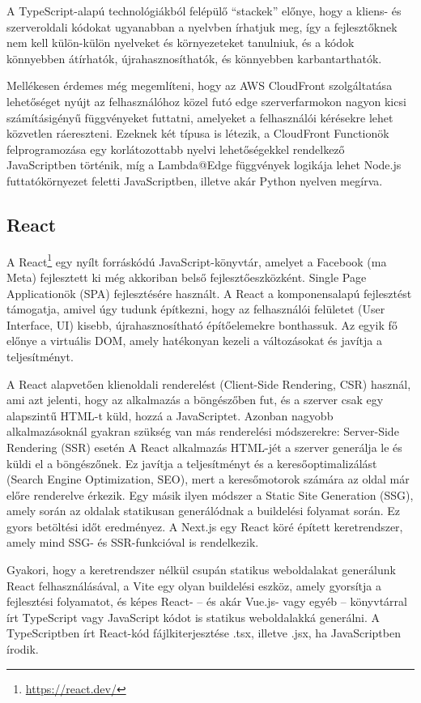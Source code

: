 A TypeScript-alapú technológiákból felépülő ``stackek'' előnye, hogy a kliens- és szerveroldali kódokat ugyanabban a nyelvben írhatjuk meg, így a fejlesztőknek nem kell külön-külön nyelveket és környezeteket tanulniuk, és a kódok könnyebben átírhatók, újrahasznosíthatók, és könnyebben karbantarthatók.

Mellékesen érdemes még megemlíteni, hogy az AWS CloudFront szolgáltatása lehetőséget nyújt az felhasználóhoz közel futó edge szerverfarmokon nagyon kicsi számításigényű függvényeket futtatni, amelyeket a felhasználói kérésekre lehet közvetlen ráereszteni. Ezeknek két típusa is létezik, a CloudFront Functionök felprogramozása egy korlátozottabb nyelvi lehetőségekkel rendelkező JavaScriptben történik, míg a Lambda@Edge függvények logikája lehet Node.js futtatókörnyezet feletti JavaScriptben, illetve akár Python nyelven megírva.

\subsection{React}

A React\footnote{\url{https://react.dev/}} egy nyílt forráskódú JavaScript-könyvtár, amelyet a Facebook (ma Meta) fejlesztett ki még akkoriban belső fejlesztőeszközként. Single Page Applicationök (SPA) fejlesztésére használt. A React a komponensalapú fejlesztést támogatja, amivel úgy tudunk építkezni, hogy az felhasználói felületet (User Interface, UI) kisebb, újrahasznosítható építőelemekre bonthassuk. Az egyik fő előnye a virtuális DOM, amely hatékonyan kezeli a változásokat és javítja a teljesítményt.

A React alapvetően klienoldali renderelést (Client-Side Rendering, CSR) használ, ami azt jelenti, hogy az alkalmazás a böngészőben fut, és a szerver csak egy alapszintű HTML-t küld, hozzá a JavaScriptet. Azonban nagyobb alkalmazásoknál gyakran szükség van más renderelési módszerekre: Server-Side Rendering (SSR) esetén A React alkalmazás HTML-jét a szerver generálja le és küldi el a böngészőnek. Ez javítja a teljesítményt és a keresőoptimalizálást (Search Engine Optimization, SEO), mert a keresőmotorok számára az oldal már előre renderelve érkezik. Egy másik ilyen módszer a Static Site Generation (SSG), amely során az oldalak statikusan generálódnak a buildelési folyamat során. Ez gyors betöltési időt eredményez. A Next.js egy React köré épített keretrendszer, amely mind SSG- és SSR-funkcióval is rendelkezik.

Gyakori, hogy a keretrendszer nélkül csupán statikus weboldalakat generálunk React felhasználásával, a Vite egy olyan buildelési eszköz, amely gyorsítja a fejlesztési folyamatot, és képes React- -- és akár Vue.js- vagy egyéb -- könyvtárral írt TypeScript vagy JavaScript kódot is statikus weboldalakká generálni. A TypeScriptben írt React-kód fájlkiterjesztése .tsx, illetve .jsx, ha JavaScriptben írodik.


